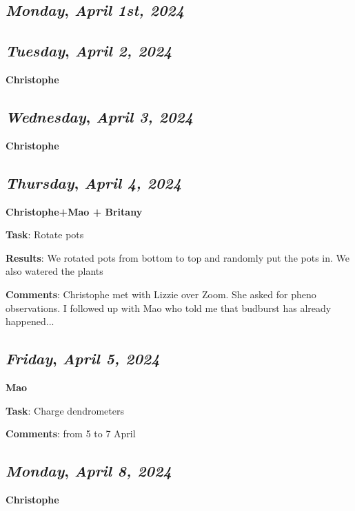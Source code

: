 \begin{center}
\section*{\month}
\end{center}

\def\day{\textit{April 1st, 2024}}
\def\weekday{\textit{Monday}}
\subsection*{\weekday, \day}

\def\day{\textit{April 2, 2024}}
\def\weekday{\textit{Tuesday}}
\subsection*{\weekday, \day}
\textbf {Christophe}

\def\day{\textit{April 3, 2024}}
\def\weekday{\textit{Wednesday}}
\subsection*{\weekday, \day}
\textbf {Christophe}

\def\day{\textit{April 4, 2024}}
\def\weekday{\textit{Thursday}}
\subsection*{\weekday, \day}
\textbf {Christophe+Mao + Britany}
\par 
\textbf {Task}: Rotate pots
\par 
\textbf {Results}: We rotated pots from bottom to top and randomly put the pots in. We also watered the plants
\par
\textbf {Comments}: Christophe met with Lizzie over Zoom. She asked for pheno observations. I followed up with Mao who told me that budburst has already happened...

\def\day{\textit{April 5, 2024}}
\def\weekday{\textit{Friday}}
\subsection*{\weekday, \day}
\textbf {Mao}
\par 
\textbf {Task}: Charge dendrometers
\par
\textbf {Comments}: from 5 to 7 April

\def\day{\textit{April 8, 2024}}
\def\weekday{\textit{Monday}}
\subsection*{\weekday, \day}
\textbf {Christophe}

